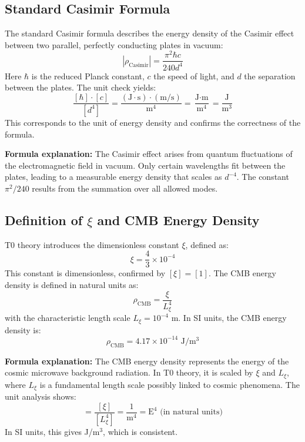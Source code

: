 	\subsection{Standard Casimir Formula}
	The standard Casimir formula describes the energy density of the Casimir effect between two parallel, perfectly conducting plates in vacuum:
	\begin{equation}
		|\rho_{\text{Casimir}}| = \frac{\pi^2 \hbar c}{240 d^4}
	\end{equation}
	Here $\hbar$ is the reduced Planck constant, $c$ the speed of light, and $d$ the separation between the plates. The unit check yields:
	\begin{equation}
		\frac{[\hbar] \cdot [c]}{[d^4]} = \frac{(\text{J} \cdot \text{s}) \cdot (\text{m}/\text{s})}{\text{m}^4} = \frac{\text{J} \cdot \text{m}}{\text{m}^4} = \frac{\text{J}}{\text{m}^3}
	\end{equation}
	This corresponds to the unit of energy density and confirms the correctness of the formula.
	
	\textbf{Formula explanation:} The Casimir effect arises from quantum fluctuations of the electromagnetic field in vacuum. Only certain wavelengths fit between the plates, leading to a measurable energy density that scales as $d^{-4}$. The constant $\pi^2/240$ results from the summation over all allowed modes.
	
	\subsection{Definition of $\xi$ and CMB Energy Density}
	T0 theory introduces the dimensionless constant $\xi$, defined as:
	\begin{equation}
		\xi = \frac{4}{3} \times 10^{-4}
	\end{equation}
	This constant is dimensionless, confirmed by $[\xi] = [1]$. The CMB energy density is defined in natural units as:
	\begin{equation}
		\rho_{\text{CMB}} = \frac{\xi}{L_\xi^4}
	\end{equation}
	with the characteristic length scale $L_\xi = 10^{-4}$ m. In SI units, the CMB energy density is:
	\begin{equation}
		\rho_{\text{CMB}} = 4.17 \times 10^{-14} \text{ J}/\text{m}^3
	\end{equation}
	
	\textbf{Formula explanation:} The CMB energy density represents the energy of the cosmic microwave background radiation. In T0 theory, it is scaled by $\xi$ and $L_\xi$, where $L_\xi$ is a fundamental length scale possibly linked to cosmic phenomena. The unit analysis shows:
	\begin{equation}
		[\rho_{\text{CMB}}] = \frac{[\xi]}{[L_\xi^4]} = \frac{1}{\text{m}^4} = \text{E}^4 \text{ (in natural units)}
	\end{equation}
	In SI units, this gives J/m$^3$, which is consistent.
	

